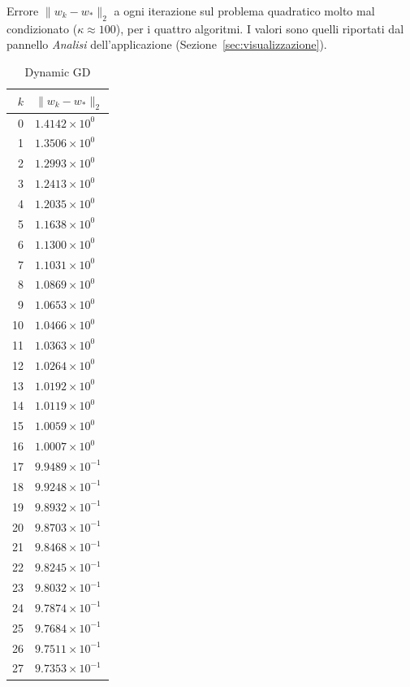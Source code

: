 \documentclass[italian, a4paper, twoside, binding=6mm]{sapthesis}
\begin{document}
\begin{table}[H]
\centering
\footnotesize
\renewcommand{\arraystretch}{0.85}
\setlength{\tabcolsep}{3pt}
\caption{Errore $\|w_k-w_*\|_2$ a ogni iterazione sul problema quadratico molto mal condizionato ($\kappa \approx 100$), per i quattro algoritmi. I valori sono quelli riportati dal pannello \emph{Analisi} dell'applicazione (Sezione~\ref{sec:visualizzazione}).}
\label{tab:test_malcond}
\begin{subtable}{0.24\textwidth}
\centering
\caption{Dynamic GD}
\begin{tabular}{@{}rl@{}}
\toprule
$k$ & $\|w_k-w_*\|_2$\\
\midrule
0 & $1.4142\times10^{0}$\\
1 & $1.3506\times10^{0}$\\
2 & $1.2993\times10^{0}$\\
3 & $1.2413\times10^{0}$\\
4 & $1.2035\times10^{0}$\\
5 & $1.1638\times10^{0}$\\
6 & $1.1300\times10^{0}$\\
7 & $1.1031\times10^{0}$\\
8 & $1.0869\times10^{0}$\\
9 & $1.0653\times10^{0}$\\
10 & $1.0466\times10^{0}$\\
11 & $1.0363\times10^{0}$\\
12 & $1.0264\times10^{0}$\\
13 & $1.0192\times10^{0}$\\
14 & $1.0119\times10^{0}$\\
15 & $1.0059\times10^{0}$\\
16 & $1.0007\times10^{0}$\\
17 & $9.9489\times10^{-1}$\\
18 & $9.9248\times10^{-1}$\\
19 & $9.8932\times10^{-1}$\\
20 & $9.8703\times10^{-1}$\\
21 & $9.8468\times10^{-1}$\\
22 & $9.8245\times10^{-1}$\\
23 & $9.8032\times10^{-1}$\\
24 & $9.7874\times10^{-1}$\\
25 & $9.7684\times10^{-1}$\\
26 & $9.7511\times10^{-1}$\\
27 & $9.7353\times10^{-1}$\\

\end{tabular}
\end{subtable}
\end{table}
\end{document}
